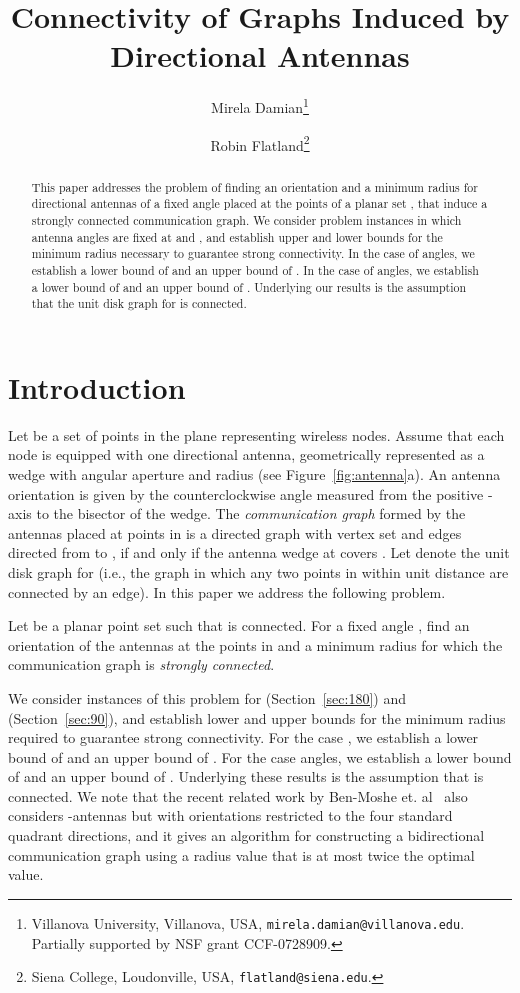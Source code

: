 \documentclass[11pt]{article}
\title{Connectivity of Graphs Induced by Directional Antennas}
\author{
Mirela Damian\thanks{Villanova University, Villanova, USA, \texttt{mirela.damian@villanova.edu}.
\newline Partially supported by NSF grant CCF-0728909.}
\and
Robin Flatland\thanks{Siena College, Loudonville, USA, \texttt{flatland@siena.edu}.}}
\date{}
\begin{document}
\maketitle

\begin{abstract}
This paper addresses the problem of finding an orientation and a minimum radius
for directional antennas of a fixed angle placed at the points of a planar set
, that induce a strongly connected communication graph.
We consider problem instances in which antenna angles are fixed at 
and , and establish upper and lower bounds for the minimum radius
necessary to guarantee strong connectivity. In the case of  angles, we
establish a lower bound of  and an upper bound of .
In the case of  angles, we establish a lower bound of
 and an upper bound of .
Underlying our results is the assumption that the unit disk graph for
 is connected.
\end{abstract}


\section{Introduction}
Let  be a set of points in the plane representing wireless nodes.
Assume that each node is equipped with one directional antenna,
geometrically represented as a wedge with angular aperture  and radius 
(see Figure~\ref{fig:antenna}a). An antenna orientation is given by the
counterclockwise angle  measured from the positive -axis to the bisector
of the wedge.
The \emph{communication graph}  formed by the antennas placed at points
in  is a directed graph with vertex set  and edges 
directed from  to , if and only if the antenna wedge at  covers .
Let  denote the unit disk graph for  (i.e., the graph in which any two
points in  within unit distance are connected by an edge).
In this paper we address the following problem.

\begin{center}
\begin{minipage}{0.75\linewidth}
Let  be a planar point set such that  is connected.
For a fixed angle , find an orientation 
of the antennas at the points in  and a minimum radius  for which
the communication graph  is \emph{strongly connected}.
\end{minipage}
\end{center}

\medskip
\noindent
We consider instances of this problem for  (Section~\ref{sec:180}) and
 (Section~\ref{sec:90}), and establish lower and upper bounds for the
minimum radius required to guarantee strong connectivity.
For the case , we establish a lower bound of  and an upper bound
of .
For the case  angles, we establish a lower bound of
 and an upper bound of . Underlying these
results is the assumption that  is connected. We note that the recent related work by 
Ben-Moshe et. al~\cite{bcckms-dawn-10}
also considers -antennas but with orientations
restricted to the four standard quadrant directions, and it gives an algorithm for
constructing a bidirectional communication graph using a radius value 
 that is at most twice the optimal value.
\end{document}
